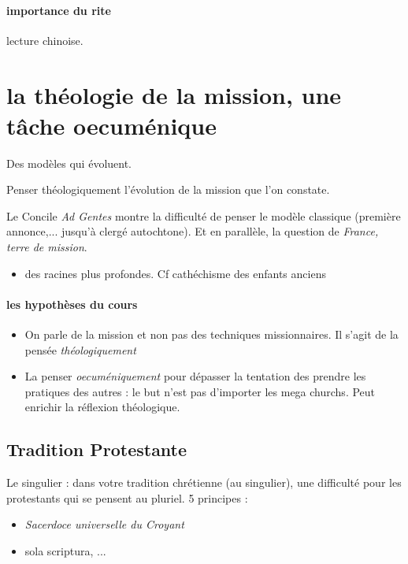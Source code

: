 \paragraph{importance du rite} lecture chinoise. 

\section{la théologie de la mission, une tâche oecuménique}

 
\begin{Def}
Des modèles qui évoluent.

Penser théologiquement l'évolution de la mission que l'on constate. 
\end{Def}

Le Concile \textit{Ad Gentes} montre la difficulté de penser le modèle classique (première annonce,... jusqu'à clergé autochtone). Et en parallèle, la question de \textit{France, terre de mission}.

\begin{itemize}
    \item des racines plus profondes. Cf cathéchisme des enfants anciens
\end{itemize}

\paragraph{les hypothèses du cours}
\begin{itemize}
    \item On parle de la mission et non pas des techniques missionnaires. Il s'agit de la pensée \textit{théologiquement}
    \item La penser \textit{oecuméniquement} pour dépasser la tentation des prendre les pratiques des autres : le but n'est pas d'importer les mega churchs. Peut enrichir la réflexion théologique.
\end{itemize}


\subsection{Tradition Protestante}

Le singulier : dans votre tradition chrétienne (au singulier), une difficulté pour les protestants qui se pensent au pluriel.
5 principes :
\begin{itemize}
    \item \textit{Sacerdoce universelle du Croyant}
    \item sola scriptura, ...
\end{itemize}

